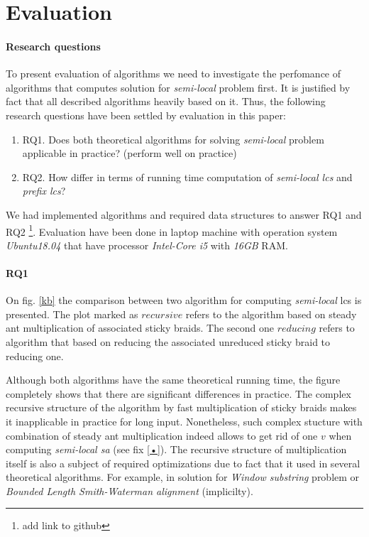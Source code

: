\section{Evaluation}
\label{section:evaluation}

\paragraph{Research questions}
To present evaluation of algorithms we need to investigate the perfomance of algorithms that computes solution for \emph{semi-local} problem first.
It is justified by fact that all described algorithms heavily based on it.
Thus, the following research questions have been settled by evaluation in this paper:
\begin{enumerate}
\item RQ1. Does both theoretical algorithms for solving \emph{semi-local} problem applicable in practice? (perform well on practice)
\item RQ2. How differ in terms of running time computation of \emph{semi-local lcs} and \emph{prefix lcs}?
\end{enumerate}

We had implemented algorithms and required data structures to answer RQ1 and RQ2 \footnote{add link to github}. Evaluation have been done in laptop machine with operation system \emph{Ubuntu18.04}  that have processor \emph{Intel-Core i5} with  \emph{16GB} RAM.

\paragraph{RQ1}

On  fig. \ref{kb} the comparison between two algorithm for computing \emph{semi-local} lcs is presented.
The plot marked as $recursive$ refers to the algorithm based on steady ant multiplication of associated sticky braids.
The second one $reducing$ refers to algorithm that based on reducing the  associated unreduced sticky braid to reducing one.

Although both algorithms have the same theoretical running time, 
the figure completely shows that there are significant differences in practice.
The complex recursive structure of the algorithm by fast multiplication of sticky braids makes it inapplicable in practice for long input.
Nonetheless, such complex stucture with combination of steady ant multiplication  indeed allows to get rid of one $v$ when computing \emph{semi-local sa} (see fix \ref{•}).
The recursive structure of multiplication itself is also a subject of required optimizations due to fact that it used in several theoretical algorithms.
For example, in solution for \emph{Window substring} problem or \emph{Bounded Length Smith-Waterman alignment} (implicilty).  

